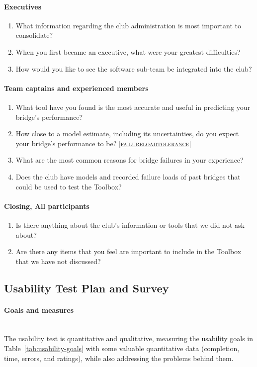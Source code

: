\documentclass[12pt, titlepage]{article}
\DeclareRobustCommand{\cname}[1]{{\renewcommand{\_}{\textunderscore\allowbreak}\textsc{#1}}}
\newcommand{\const}[1]{\hyperlink{const:\detokenize{#1}}{\cname{#1}}}
\begin{document}
\paragraph{Executives}
\begin{enumerate}
  \item What information regarding the club administration is most important to consolidate?
  \item When you first became an executive, what were your greatest difficulties?
  \item How would you like to see the software sub-team be integrated into the club?
\end{enumerate}

\paragraph{Team captains and experienced members}
\begin{enumerate}
  \item What tool have you found is the most accurate and useful in predicting your bridge's performance?
  \item How close to a model estimate, including its uncertainties, do you expect your bridge's performance to be? [\const{failure\_load\_tolerance}]
  \item What are the most common reasons for bridge failures in your experience?
  \item Does the club have models and recorded failure loads of past bridges that could be used to test the Toolbox?
\end{enumerate}

\paragraph{Closing, All participants}
\begin{enumerate}
  \item Is there anything about the club's information or tools that we did not ask about?
  \item Are there any items that you feel are important to include in the Toolbox that we have not discussed?
\end{enumerate}

\subsection{Usability Test Plan and Survey}
\label{app:usability}

\paragraph{Goals and measures}\mbox{}\\
The usability test is quantitative and qualitative, measuring the usability goals in
Table~\ref{tab:usability-goals} with some valuable quantitative data (completion, time, errors, and ratings), while also addressing 
the problems behind them.
\end{document}
